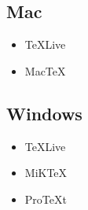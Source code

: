 \documentclass[hidelinks]{article}
\begin{document}
        \subsection{Mac}
            \begin{itemize}
                \item TeXLive
                \item MacTeX
            \end{itemize}
        \subsection{Windows}
            \begin{itemize}
                \item TeXLive
                \item MiKTeX
                \item ProTeXt
            \end{itemize}

    \clearpage
    \standaloneBib
\end{document}
